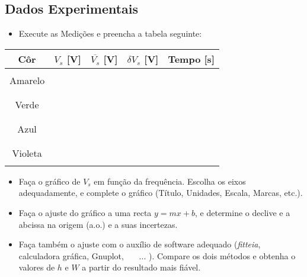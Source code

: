 \documentclass[a4paper,12pt]{article}  %
\begin{document}
\newpage


\subsection{\sf Dados Experimentais}

\begin{itemize}
\item Execute as Medições e preencha a tabela seguinte:
\end{itemize}

\begin{center}
	\begin{tabular}{|c|c|c|c|c|}
	\hline
	Côr  & $V_s$ [V] & $\overline{V_s}$ [V]	& $\delta V_s$ [V] & Tempo [s] \\
	\hline
	 &  &  &  & \\ \cline{2-2}
	Amarelo &  & & &  \\ \cline{2-2}
	 &  &  &  & \\ 
	\hline
	 &  &  &  & \\ \cline{2-2}
	Verde & & & & \\ \cline{2-2}
	 &  &  &  & \\ 
	\hline
	 &  &  &  & \\ \cline{2-2}
	Azul & & & & \\ \cline{2-2}
	 &  &  &  & \\ 
	\hline
	 &  &  &  & \\ \cline{2-2}
	Violeta & & & & \\ \cline{2-2}
	 &  &  &  & \\ 
	\hline
 	\end{tabular}
\end{center}

\begin{itemize}
\item  Faça o gráfico de $V_s$ em função da frequência. Escolha os eixos adequadamente, e complete o gráfico (Título, Unidades, Escala, Marcas, etc.). 
\item Faça o ajuste do gráfico a uma recta $y=mx + b$, e determine o declive e a  abcissa na origem (a.o.) e a suas incertezas.
\item Faça também o ajuste com o auxílio de software adequado (\emph{fitteia}, calculadora gráfica, Gnuplot, ~~~... ). Compare os dois métodos e obtenha o valores de $h$ e $W$ a partir do resultado mais fiável.  
\end{itemize}
\end{document}
